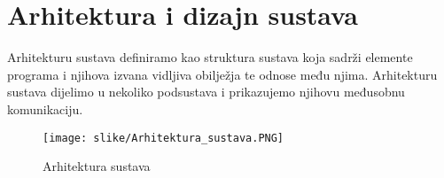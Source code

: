 \chapter{Arhitektura i dizajn sustava}
		

	\begin{comment}	
	\begin{itemize}
		\item 	\textit{izbor arhitekture temeljem principa oblikovanja pokazanih na predavanjima (objasniti zašto ste baš odabrali takvu arhitekturu)}
		\item 	\textit{organizaciju sustava s najviše razine apstrakcije (npr. klijent-poslužitelj, baza podataka, datotečni sustav, grafičko sučelje)}
		\item 	\textit{organizaciju aplikacije (npr. slojevi frontend i backend, MVC arhitektura) }		
	\end{itemize}
	\end{comment}
	Arhitekturu sustava definiramo kao struktura sustava koja sadrži elemente programa i njihova izvana vidljiva obilježja te odnose među njima. Arhitekturu sustava dijelimo u nekoliko podsustava i prikazujemo njihovu međusobnu komunikaciju. \\
		\begin{figure}[H]
		\texttt{[image: slike/Arhitektura\_sustava.PNG]} %
		\centering
		\caption{Arhitektura sustava}
		\label{fig:promjene}
		\end{figure}
	
